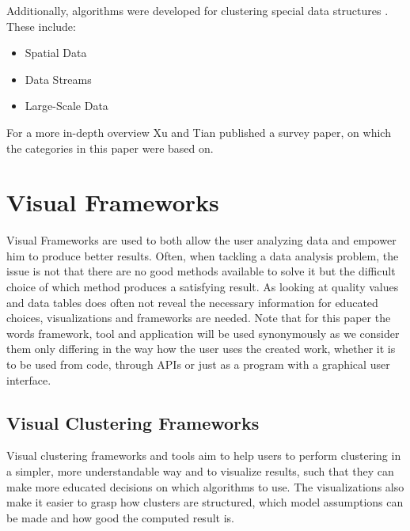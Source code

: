 \documentclass[
	a4paper,
	english,
	twoside,
	openright,               
	11pt                            
	]{report}
\begin{document}
Additionally, algorithms were developed for clustering special data structures \cite{surveyclustering}. These include:

\begin{itemize}
  \item Spatial Data
  \item Data Streams
  \item Large-Scale Data
\end{itemize}

For a more in-depth overview Xu and Tian \cite{surveyclustering} published a survey paper, on which the categories in this paper were based on.

\section{Visual Frameworks}
Visual Frameworks are used to both allow the user analyzing data and empower him to produce better results. Often, when tackling a data analysis problem, the issue is not that there are no good methods available to solve it but the difficult choice of which method produces a satisfying result. As looking at quality values and data tables does often not reveal the necessary information for educated choices, visualizations and frameworks are needed. Note that for this paper the words framework, tool and application will be used synonymously as we consider them only differing in the way how the user uses the created work, whether it is to be used from code, through APIs or just as a program with a graphical user interface.

\subsection{Visual Clustering Frameworks}
Visual clustering frameworks and tools aim to help users to perform clustering in a simpler, more understandable way and to visualize results, such that they can make more educated decisions on which algorithms to use. The visualizations also make it easier to grasp how clusters are structured, which model assumptions can be made and how good the computed result is.
\end{document}

